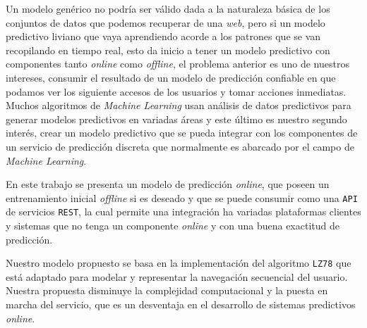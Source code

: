 Un modelo genérico no podría ser válido dada a la naturaleza básica de los conjuntos de datos que podemos recuperar de una \emph{web}, pero si un modelo predictivo liviano que vaya aprendiendo acorde a los patrones que se van recopilando en tiempo real, esto da inicio a tener un modelo predictivo con componentes tanto \emph{online} como \emph{offline}, el problema anterior es uno de nuestros intereses, consumir el resultado de un modelo de predicción confiable en que podamos ver los siguiente accesos de los usuarios y tomar acciones inmediatas. Muchos algoritmos de \emph{Machine Learning} usan análisis de datos predictivos para generar modelos predictivos en variadas áreas y este último es nuestro segundo interés, crear un modelo predictivo que se pueda integrar con los componentes de un servicio de predicción discreta que normalmente es abarcado por el campo de \emph{Machine Learning}.  

En este trabajo se presenta un modelo de predicción \emph{online}, que poseen un entrenamiento inicial \emph{offline} si es deseado y que se puede consumir como una \texttt{API} de servicios \texttt{REST}, la cual permite una integración ha variadas plataformas clientes y sistemas que no tenga un componente \emph{online} y con una buena exactitud de predicción. 

Nuestro modelo propuesto se basa en la implementación del algoritmo \texttt{LZ78} que está adaptado para modelar y representar la navegación secuencial del usuario. Nuestra propuesta disminuye la complejidad computacional  y la puesta en marcha del servicio, que es un desventaja en el desarrollo de sistemas predictivos \emph{online}.












